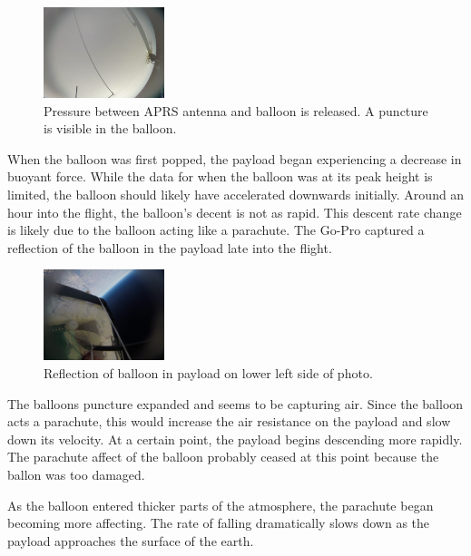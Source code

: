 \documentclass[12pt,]{article}
\begin{document}
\begin{figure}[h]

{\centering \includegraphics[height=100px]{assets/IMAGEBREAKC} 

}

\caption{\label{fig:figs} Pressure between APRS antenna and balloon is released. A puncture is visible in the balloon.}\label{fig:imagebreakc}
\end{figure}

When the balloon was first popped, the payload began experiencing a
decrease in buoyant force. While the data for when the balloon was at
its peak height is limited, the balloon should likely have accelerated
downwards initially. Around an hour into the flight, the balloon's
decent is not as rapid. This descent rate change is likely due to the
balloon acting like a parachute. The Go-Pro captured a reflection of the
balloon in the payload late into the flight.

\begin{figure}[h]

{\centering \includegraphics[height=100px]{assets/IMAGEBREAKD} 

}

\caption{\label{fig:figs} Reflection of balloon in payload on lower left side of photo.}\label{fig:imagebreakd}
\end{figure}

The balloons puncture expanded and seems to be capturing air. Since the
balloon acts a parachute, this would increase the air resistance on the
payload and slow down its velocity. At a certain point, the payload
begins descending more rapidly. The parachute affect of the balloon
probably ceased at this point because the ballon was too damaged.

As the balloon entered thicker parts of the atmosphere, the parachute
began becoming more affecting. The rate of falling dramatically slows
down as the payload approaches the surface of the earth.
\end{document}
